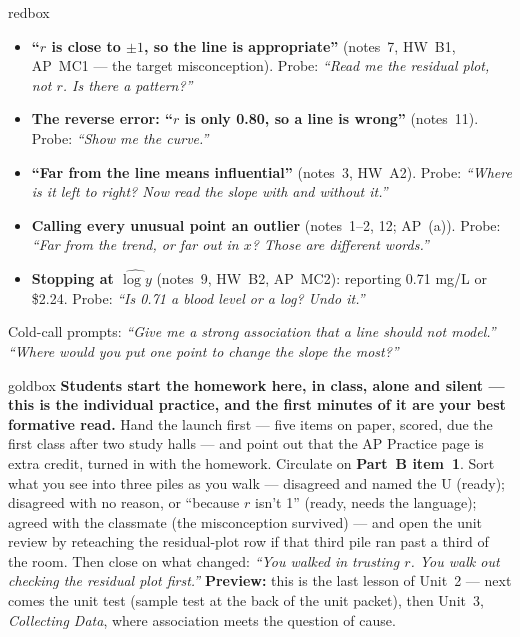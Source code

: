 \documentclass[10pt]{article}
\begin{document}
\boxguard
\begin{skillbox}{redbox}
\begin{itemize}[leftmargin=1.2em, nosep]
  \item \textbf{``$r$ is close to $\pm1$, so the line is appropriate''} (notes~7, HW~B1,
        AP~MC1 --- the target misconception). Probe: \emph{``Read me the residual plot, not
        $r$. Is there a pattern?''}
  \item \textbf{The reverse error: ``$r$ is only 0.80, so a line is wrong''} (notes~11).
        Probe: \emph{``Show me the curve.''}
  \item \textbf{``Far from the line means influential''} (notes~3, HW~A2). Probe:
        \emph{``Where is it left to right? Now read the slope with and without it.''}
  \item \textbf{Calling every unusual point an outlier} (notes~1--2, 12; AP~(a)). Probe:
        \emph{``Far from the trend, or far out in $x$? Those are different words.''}
  \item \textbf{Stopping at $\widehat{\log y}$} (notes~9, HW~B2, AP~MC2): reporting 0.71 mg/L
        or \$2.24. Probe: \emph{``Is 0.71 a blood level or a log? Undo it.''}
\end{itemize}
Cold-call prompts: \emph{``Give me a strong association that a line should not model.''} \quad
\emph{``Where would you put one point to change the slope the most?''}
\end{skillbox}

\boxguard
\begin{skillbox}{goldbox}
\textbf{Students start the homework here, in class, alone and silent --- this is the individual
practice, and the first minutes of it are your best formative read.} Hand the launch first ---
five items on paper, scored, due the first class after two study halls --- and point out that
the AP Practice page is extra credit, turned in with the homework. Circulate on \textbf{Part~B
item~1}. Sort what you see into three piles as you walk --- disagreed and named the U (ready);
disagreed with no reason, or ``because $r$ isn't 1'' (ready, needs the language); agreed with
the classmate (the misconception survived) --- and open the unit review by reteaching the
residual-plot row if that third pile ran past a third of the room. Then close on what changed:
\emph{``You walked in trusting $r$. You walk out checking the residual plot first.''}
\textbf{Preview:} this is the last lesson of Unit~2 --- next comes the unit test (sample test
at the back of the unit packet), then Unit~3, \emph{Collecting Data}, where association meets
the question of cause.
\end{skillbox}
\end{document}
